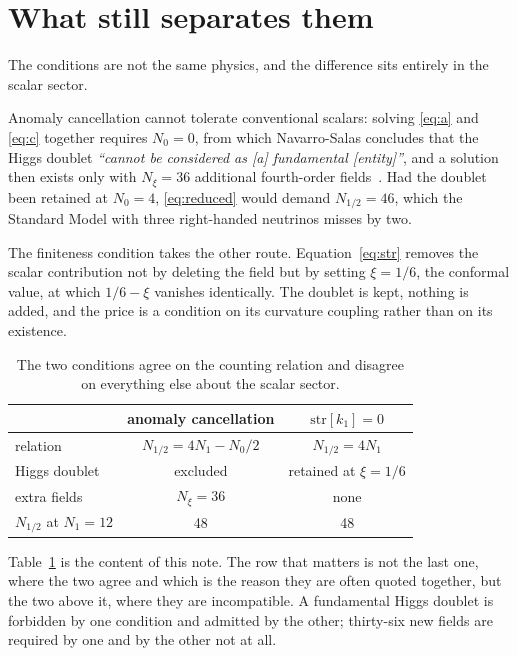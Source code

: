 \documentclass[aps,prd,twocolumn,superscriptaddress,nofootinbib,10pt]{revtex4-2}
\begin{document}
\section{What still separates them}\label{sec:separate}

The conditions are not the same physics, and the difference sits entirely in the scalar sector.

Anomaly cancellation cannot tolerate conventional scalars: solving \eqref{eq:a} and \eqref{eq:c}
together requires $N_0 = 0$, from which Navarro-Salas concludes that the Higgs doublet
\emph{``cannot be considered as [a] fundamental [entity]''}, and a solution then exists only with
$N_\xi = 36$ additional fourth-order fields~\cite{NavarroSalas2024}. Had the doublet been retained
at $N_0 = 4$, \eqref{eq:reduced} would demand $N_{1/2} = 46$, which the Standard Model with three
right-handed neutrinos misses by two.

The finiteness condition takes the other route. Equation~\eqref{eq:str} removes the scalar
contribution not by deleting the field but by setting $\xi = 1/6$, the conformal value, at which
$1/6 - \xi$ vanishes identically. The doublet is kept, nothing is added, and the price is a
condition on its curvature coupling rather than on its existence.

\begin{table}[t]
\caption{The two conditions agree on the counting relation and disagree on everything else about
the scalar sector.}
\label{tab:compare}
\begin{ruledtabular}
\begin{tabular}{lcc}
 & anomaly cancellation & $\mathrm{str}[k_1] = 0$ \\
\hline
relation            & $N_{1/2} = 4N_1 - N_0/2$ & $N_{1/2} = 4N_1$ \\
Higgs doublet       & excluded                 & retained at $\xi = 1/6$ \\
extra fields        & $N_\xi = 36$             & none \\
$N_{1/2}$ at $N_1 = 12$ & 48                   & 48 \\
\end{tabular}
\end{ruledtabular}
\end{table}

Table~\ref{tab:compare} is the content of this note. The row that matters is not the last one,
where the two agree and which is the reason they are often quoted together, but the two above it,
where they are incompatible. A fundamental Higgs doublet is forbidden by one condition and admitted
by the other; thirty-six new fields are required by one and by the other not at all.
\end{document}
